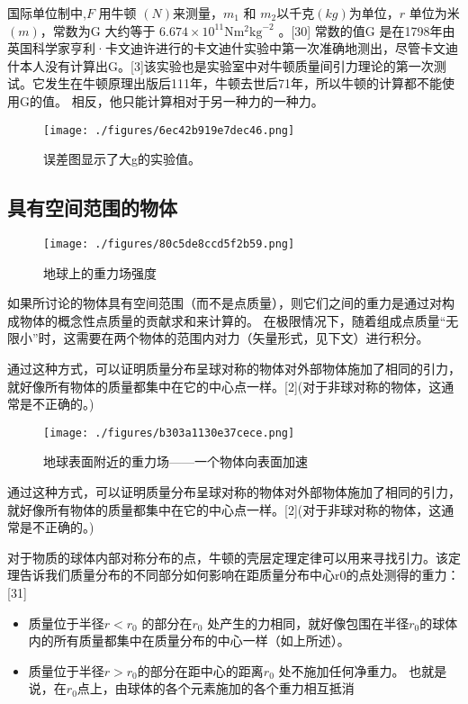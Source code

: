 国际单位制中,$F$ 用牛顿 $(N)$来测量，$m_1$ 和 $m_2$以千克$(kg)$为单位，$r$ 单位为米$(m)$，常数为G 大约等于 $ 6.674 \times 10^{11}  \text{N} \text{m}^2 \text{kg}^{-2}$ 。[30] 常数的值G 是在1798年由英国科学家亨利·卡文迪许进行的卡文迪什实验中第一次准确地测出，尽管卡文迪什本人没有计算出G。[3]该实验也是实验室中对牛顿质量间引力理论的第一次测试。它发生在牛顿原理出版后111年，牛顿去世后71年，所以牛顿的计算都不能使用G的值。 相反，他只能计算相对于另一种力的一种力。

\begin{figure}[ht]
\centering
\texttt{[image: ./figures/6ec42b919e7dec46.png]}
\caption{误差图显示了大g的实验值。} \label{fig_UG_3}
\end{figure}

\subsection{具有空间范围的物体}

\begin{figure}[ht]
\centering
\texttt{[image: ./figures/80c5de8ccd5f2b59.png]}
\caption{地球上的重力场强度} \label{fig_UG_4}
\end{figure}

如果所讨论的物体具有空间范围（而不是点质量），则它们之间的重力是通过对构成物体的概念性点质量的贡献求和来计算的。 在极限情况下，随着组成点质量“无限小”时，这需要在两个物体的范围内对力（矢量形式，见下文）进行积分。

通过这种方式，可以证明质量分布呈球对称的物体对外部物体施加了相同的引力，就好像所有物体的质量都集中在它的中心点一样。[2](对于非球对称的物体，这通常是不正确的。)

\begin{figure}[ht]
\centering
\texttt{[image: ./figures/b303a1130e37cece.png]}
\caption{地球表面附近的重力场——一个物体向表面加速} \label{fig_UG_5}
\end{figure}

通过这种方式，可以证明质量分布呈球对称的物体对外部物体施加了相同的引力，就好像所有物体的质量都集中在它的中心点一样。[2](对于非球对称的物体，这通常是不正确的。)

对于物质的球体内部对称分布的点，牛顿的壳层定理定律可以用来寻找引力。该定理告诉我们质量分布的不同部分如何影响在距质量分布中心r0的点处测得的重力：[31]

\begin{itemize}
\item 质量位于半径$r <r_0$ 的部分在$r_0$ 处产生的力相同，就好像包围在半径$r_0$的球体内的所有质量都集中在质量分布的中心一样（如上所述）。
\item 质量位于半径$r> r_0$的部分在距中心的距离$r_0$ 处不施加任何净重力。 也就是说，在$r_0$点上，由球体的各个元素施加的各个重力相互抵消
\end{itemize}


